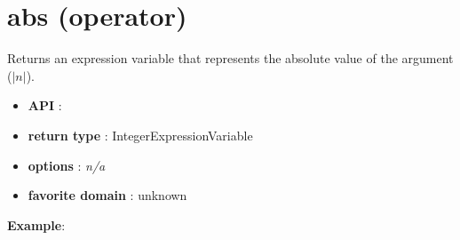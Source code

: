 \section{abs (operator)}\label{abs:absoperator}\hypertarget{abs:absoperator}{}
Returns an expression variable that represents the absolute value of the argument (\(|n|\)).

\begin{itemize}
	\item \textbf{API} : 
	\item \textbf{return type} : IntegerExpressionVariable
	\item \textbf{options} : \emph{n/a}
	\item \textbf{favorite domain} : unknown
\end{itemize}

\textbf{Example}:


